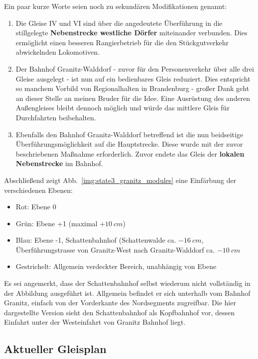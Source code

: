 Ein paar kurze Worte seien noch zu sekund\"aren Modifikationen genannt:
\begin{enumerate}
	\item Die Gleise IV und VI sind \"uber die angedeutete \"Uberf\"uhrung in die stillgelegte \textbf{Nebenstrecke westliche D\"orfer} miteinander verbunden.
	Dies erm\"oglicht einen besseren Rangierbetrieb f\"ur die den St\"uckgutverkehr abwickelnden Lokomotiven.
	\item Der Bahnhof Granitz-Walddorf - zuvor f\"ur den Personenverkehr \"uber alle drei Gleise ausgelegt - ist nun auf ein bedienbares Gleis reduziert.
	Dies entspricht so manchem Vorbild von Regionalhalten in Brandenburg - gro{\ss}er Dank geht an dieser Stelle an meinen Bruder f\"ur die Idee.
	Eine Ausr\"ustung des anderen Au{\ss}engleises bleibt dennoch m\"oglich und w\"urde das mittlere Gleis f\"ur Durchfahrten beibehalten.
	\item Ebenfalls den Bahnhof Granitz-Walddorf betreffend ist die nun beidseitige \"Uberf\"uhrungsm\"oglichkeit auf die Hauptstrecke.
	Diese wurde mit der zuvor beschriebenen Ma{\ss}nahme erforderlich.
	Zuvor endete das Gleis der \textbf{lokalen Nebenstrecke} im Bahnhof.
\end{enumerate}

Abschlie{\ss}end zeigt Abb.~\ref{img:state3_granitz_modules} eine Einf\"arbung der verschiedenen Ebenen:
\begin{itemize}
	\item Rot: Ebene 0
	\item Gr\"un: Ebene +1 (maximal $+10~cm$)
	\item Blau: Ebene -1, Schattenbahnhof (Schattenwalde ca. $-16~cm$, \"Uberf\"uhrungstrasse von Granitz-West nach Granitz-Walddorf ca. $-10~cm$
	\item Gestrichelt: Allgemein verdeckter Bereich, unabh\"angig von Ebene
\end{itemize}
Es sei angemerkt, dass der Schattenbahnhof selbst wiederum nicht vollst\"andig in der Abbildung ausgef\"uhrt ist.
Allgemein befindet er sich unterhalb vom Bahnhof Granitz, einfach von der Vorderkante des Nordsegments zugreifbar.
Die hier dargestellte Version sieht den Schattenbahnhof als Kopfbahnhof vor, dessen Einfahrt unter der Westeinfahrt von Granitz Bahnhof liegt.





\subsection{Aktueller Gleisplan}
\label{sec:map_date}

